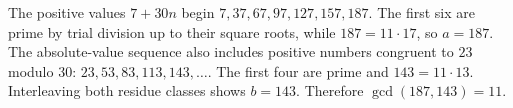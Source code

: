The positive values $7+30n$ begin $7,37,67,97,127,157,187$. The first six are prime by trial division up to their square roots, while $187=11\cdot17$, so $a=187$. The absolute-value sequence also includes positive numbers congruent to $23$ modulo 30: $23,53,83,113,143,\ldots$. The first four are prime and $143=11\cdot13$. Interleaving both residue classes shows $b=143$. Therefore $\gcd(187,143)=\boxed{11}$.
